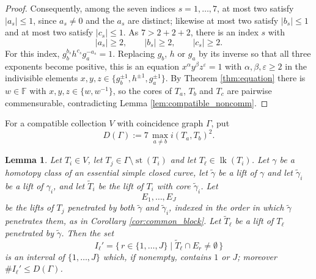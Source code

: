 \documentclass[12pt,a4paper]{amsart}
\numberwithin{equation}{section}
\newcommand{\FF}{\mathbb{F}}
\theoremstyle{plain}
\newtheorem{lemma}[theorem]{Lemma}
\theoremstyle{definition}
\theoremstyle{remark}
\begin{document}
\begin{proof}
    Consequently, among the seven indices $s = 1, \ldots, 7$, at most two satisfy $\lvert a_s \rvert \le 1$, since $a_s \ne 0$ and the $a_s$ are distinct; likewise at most two satisfy $\lvert b_s \rvert \le 1$ and at most two satisfy $\lvert c_s \rvert \le 1$.
    As $7 > 2 + 2 + 2$, there is an index $s$ with
    \[
        \lvert a_s \rvert \ge 2, \qquad \lvert b_s \rvert \ge 2, \qquad \lvert c_s \rvert \ge 2 .
    \]
    For this index, $g_b^{b_s} h^{c_s} g_a^{-a_s} = 1$.
    Replacing $g_b$, $h$ or $g_a$ by its inverse so that all three exponents become positive, this is an equation $x^{\alpha} y^{\beta} z^{\varepsilon} = 1$ with $\alpha, \beta, \varepsilon \ge 2$ in the indivisible elements $x, y, z \in \{g_b^{\pm 1}, h^{\pm 1}, g_a^{\pm 1}\}$.
    By Theorem \ref{thm:equation} there is $w \in \FF$ with $x, y, z \in \{w, w^{-1}\}$, so the cores of $T_a$, $T_b$ and $T_c$ are pairwise commensurable, contradicting Lemma \ref{lem:compatible_noncomm}.
\end{proof}

For a compatible collection $V$ with coincidence graph $\Gamma$, put
\[
    D(\Gamma) := 7 \, \max_{a \neq b} i(T_a, T_b)^2 .
\]

\begin{lemma} \label{lem:end_block}
    Let $T_i \in V$, let $T_j \in \Gamma \setminus \operatorname{st}(T_i)$ and let $T_\ell \in \operatorname{lk}(T_i)$.
    Let $\gamma$ be a homotopy class of an essential simple closed curve, let $\tilde\gamma$ be a lift of $\gamma$ and let $\tilde\gamma_i$ be a lift of $\gamma_i$, and let $\tilde T_i$ be the lift of $T_i$ with core $\tilde\gamma_i$.
    Let
    \[
        E_1, \ldots, E_J
    \]
    be the lifts of $T_j$ penetrated by both $\tilde\gamma$ and $\tilde\gamma_i$, indexed in the order in which $\tilde\gamma$ penetrates them, as in Corollary \ref{cor:common_block}.
    Let $\tilde T_\ell$ be a lift of $T_\ell$ penetrated by $\tilde\gamma$.
    Then the set
    \[
        I_\ell' = \{\, r \in \{1, \ldots, J\} \mid \tilde T_\ell \cap E_r \ne \emptyset \,\}
    \]
    is an interval of $\{1, \ldots, J\}$ which, if nonempty, contains $1$ or $J$; moreover $\# I_\ell' \le D(\Gamma)$.
\end{lemma}
\end{document}
